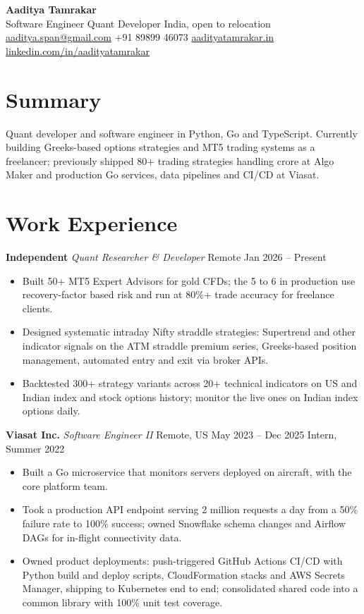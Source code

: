 \documentclass[10pt,a4paper]{article}
\newcommand{\job}[3]{\textbf{#1} \; \textit{#2} \hfill #3}
\begin{document}
\begin{center}
  {\LARGE\bfseries Aaditya Tamrakar}\\[2pt]
  Software Engineer \textperiodcentered{} Quant Developer \textperiodcentered{} India, open to relocation\\[2pt]
  \href{mailto:aaditya.span@gmail.com}{aaditya.span@gmail.com} \textperiodcentered{} +91 89899 46073 \textperiodcentered{}
  \href{https://aadityatamrakar.in}{aadityatamrakar.in} \textperiodcentered{}
  \href{https://www.linkedin.com/in/aadityatamrakar/}{linkedin.com/in/aadityatamrakar}
\end{center}

\section{Summary}
Quant developer and software engineer in Python, Go and TypeScript. Currently building Greeks-based options strategies and MT5 trading systems as a freelancer; previously shipped 80+ trading strategies handling  crore at Algo Maker and production Go services, data pipelines and CI/CD at Viasat.

\section{Work Experience}
\job{Independent}{Quant Researcher \& Developer}{Remote \textperiodcentered{} Jan 2026 -- Present}
\begin{itemize}
  \item Built 50+ MT5 Expert Advisors for gold CFDs; the 5 to 6 in production use recovery-factor based risk and run at 80\%+ trade accuracy for freelance clients.
  \item Designed systematic intraday Nifty straddle strategies: Supertrend and other indicator signals on the ATM straddle premium series, Greeks-based position management, automated entry and exit via broker APIs.
  \item Backtested 300+ strategy variants across 20+ technical indicators on US and Indian index and stock options history; monitor the live ones on Indian index options daily.
\end{itemize}

\job{Viasat Inc.}{Software Engineer II}{Remote, US \textperiodcentered{} May 2023 -- Dec 2025 \textperiodcentered{} Intern, Summer 2022}
\begin{itemize}
  \item Built a Go microservice that monitors servers deployed on aircraft, with the core platform team.
  \item Took a production API endpoint serving 2 million requests a day from a 50\% failure rate to 100\% success; owned Snowflake schema changes and Airflow DAGs for in-flight connectivity data.
  \item Owned product deployments: push-triggered GitHub Actions CI/CD with Python build and deploy scripts, CloudFormation stacks and AWS Secrets Manager, shipping to Kubernetes end to end; consolidated shared code into a common library with 100\% unit test coverage.
\end{itemize}
\end{document}
